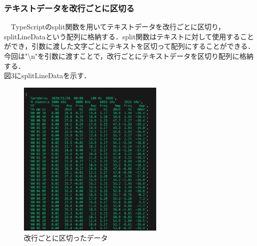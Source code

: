 \subsubsection{テキストデータを改行ごとに区切る}
　TypeScriptのsplit関数を用いてテキストデータを改行ごとに区切り，splitLineDataという配列に格納する．split関数はテキストに対して使用することができ，引数に渡した文字ごとにテキストを区切って配列にすることができる．今回は"\textbackslash n"を引数に渡すことで，改行ごとにテキストデータを区切り配列に格納する．\\
 図3にsplitLineDataを示す．\\
 \begin{figure}[h]
   \centering
   \caption{改行ごとに区切ったデータ}
   \label{fig:my_label}
   \includegraphics[width=70mm]{fig/splitLineData.png}
 \end{figure}
 
